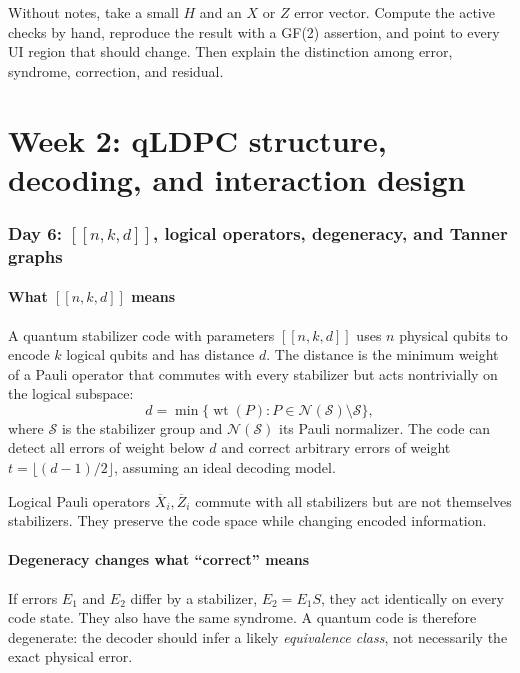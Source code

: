 \documentclass[11pt]{article}
\newcommand{\wt}{\operatorname{wt}}
\begin{document}
\begin{masterybox}[title={Week 1 pass condition}]
Without notes, take a small \(H\) and an \(X\) or \(Z\) error vector. Compute the active checks by
hand, reproduce the result with a GF(2) assertion, and point to every UI region that should change.
Then explain the distinction among error, syndrome, correction, and residual.
\end{masterybox}

\part{Week 2: qLDPC structure, decoding, and interaction design}

\section{Day 6: \texorpdfstring{\([[n,k,d]]\)}{[[n,k,d]]}, logical operators, degeneracy, and Tanner graphs}

\subsection{What \([[n,k,d]]\) means}

A quantum stabilizer code with parameters \([[n,k,d]]\) uses \(n\) physical qubits to encode
\(k\) logical qubits and has distance \(d\). The distance is the minimum weight of a Pauli operator
that commutes with every stabilizer but acts nontrivially on the logical subspace:
\[
d=\min\{\wt(P):P\in\mathcal N(\mathcal S)\setminus\mathcal S\},
\]
where \(\mathcal S\) is the stabilizer group and \(\mathcal N(\mathcal S)\) its Pauli normalizer.
The code can detect all errors of weight below \(d\) and correct arbitrary errors of weight
\(t=\lfloor(d-1)/2\rfloor\), assuming an ideal decoding model.

Logical Pauli operators \(\overline X_i,\overline Z_i\) commute with all stabilizers but are not
themselves stabilizers. They preserve the code space while changing encoded information.

\subsection{Degeneracy changes what ``correct'' means}

If errors \(E_1\) and \(E_2\) differ by a stabilizer, \(E_2=E_1S\), they act identically on every
code state. They also have the same syndrome. A quantum code is therefore degenerate: the decoder
should infer a likely \emph{equivalence class}, not necessarily the exact physical error.
\end{document}
